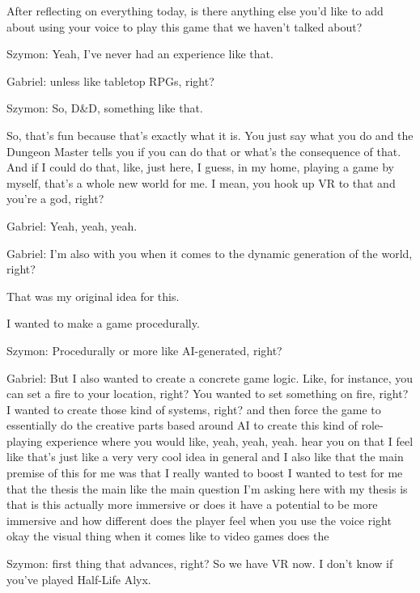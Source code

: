 \begin{QandA}
   \item After reflecting on everything today, is there anything else you’d like to add about using your voice to play this game that we haven't talked about?

         \begin{answered}
            Szymon: Yeah, I've never had an experience like that.

            Gabriel: unless like tabletop RPGs, right?

            Szymon: So, D\&D, something like that.

            So, that's fun because that's exactly what it is.
            You just say what you do and the Dungeon Master tells you if you can do that or what's the consequence of that.
            And if I could do that, like, just here, I guess, in my home, playing a game by myself, that's a whole new world for me.
            I mean, you hook up VR to that and you're a god, right?

            Gabriel: Yeah, yeah, yeah.

            Gabriel: I'm also with you when it comes to the dynamic generation of the world, right?

            That was my original idea for this.

            I wanted to make a game procedurally.

            Szymon: Procedurally or more like AI-generated, right?

            Gabriel: But I also wanted to create a concrete game logic.
            Like, for instance, you can set a fire to your location, right?
            You wanted to set something on fire, right?
            I wanted to create those kind of systems, right?
            and then force the game to essentially do the creative parts based around AI to create this kind of role-playing experience where you would like, yeah, yeah, yeah.
            hear you on that I feel like that's just like a very very cool idea in general and I also like that the main premise of this for me was that I really wanted to boost I wanted to test for me that the thesis the main like the main question I'm asking here with my thesis is that is this actually more immersive or does it have a potential to be more immersive and how different does the player feel when you use the voice right okay the visual thing when it comes like to video games does the

            Szymon: first thing that advances, right?
            So we have VR now.
            I don't know if you've played Half-Life Alyx.


\end{answered}
\end{QandA}
